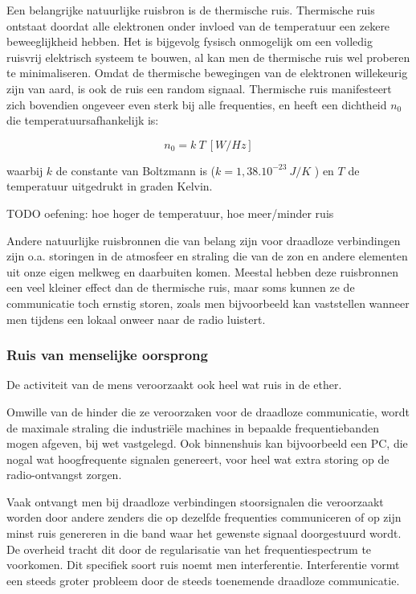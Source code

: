 Een belangrijke natuurlijke ruisbron is de thermische ruis. Thermische ruis ontstaat doordat alle elektronen onder invloed van de temperatuur een zekere beweeglijkheid hebben. Het is bijgevolg fysisch onmogelijk om een volledig ruisvrij elektrisch systeem te bouwen, al kan men de thermische ruis wel proberen te minimaliseren. Omdat de thermische bewegingen van de elektronen willekeurig zijn van aard, is ook de ruis een random signaal. Thermische ruis manifesteert zich bovendien ongeveer even sterk bij alle frequenties, en heeft een dichtheid $n_0$ die temperatuursafhankelijk is:

\begin{equation*}
    n_0 = k~T ~ [W/Hz]
\end{equation*}

waarbij $k$ de constante van Boltzmann is ($k =1,38.10^{-23}~J/K$ ) en $T$ de temperatuur uitgedrukt in graden Kelvin.

TODO oefening: hoe hoger de temperatuur, hoe meer/minder ruis

Andere natuurlijke ruisbronnen die van belang zijn voor draadloze verbindingen zijn o.a. storingen in de atmosfeer en straling die van de zon en andere elementen uit onze eigen melkweg en daarbuiten komen. Meestal hebben deze ruisbronnen een veel kleiner effect dan de thermische ruis, maar soms kunnen ze de communicatie toch ernstig storen, zoals men bijvoorbeeld kan vaststellen wanneer men tijdens een lokaal onweer naar de radio luistert.

\subsubsection{Ruis van menselijke oorsprong}

De activiteit van de mens veroorzaakt ook heel wat ruis in de ether.

Omwille van de hinder die ze veroorzaken voor de draadloze communicatie, wordt de maximale straling die industri\"ele machines in bepaalde frequentiebanden mogen afgeven, bij wet vastgelegd. Ook binnenshuis kan bijvoorbeeld een PC, die nogal wat hoogfrequente signalen genereert, voor heel wat extra storing op de radio-ontvangst zorgen.

Vaak ontvangt men bij draadloze verbindingen stoorsignalen die veroorzaakt worden door andere zenders die op dezelfde frequenties communiceren of op zijn minst ruis genereren in die band waar het gewenste signaal doorgestuurd wordt. De overheid tracht dit door de regularisatie van het frequentiespectrum te voorkomen. Dit specifiek soort ruis noemt men interferentie. Interferentie vormt een steeds groter probleem door de steeds toenemende draadloze communicatie.

